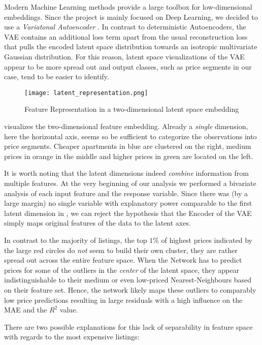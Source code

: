Modern Machine Learning methods provide a large toolbox for low-dimensional embeddings.
Since the project is mainly focused on Deep Learning, we decided to use a \emph{Variatonal Autoencoder} \citep{kingma2014}.
In contrast to deterministic Autoencoders, the VAE contains an additional loss term apart from the usual reconstruction loss that pulls the encoded latent space distribution towards an isotropic multivariate Gaussian distribution.
For this reason, latent space visualizations of the VAE appear to be more spread out and output classes, such as price segments in our case, tend to be easier to identify.

\begin{figure}[t]
  \centering
  \texttt{[image: latent\_representation.png]}
  \caption{Feature Representation in a two-dimensional latent space embedding}
  \label{fig:latent-representation}
\end{figure}

 visualizes the two-dimensional feature embedding.
Already a \emph{single} dimension, here the horizontal axis, seems so be sufficient to categorize the observations into price segments.
Cheaper apartments in blue are clustered on the right, medium prices in orange in the middle and higher prices in green are located on the left.

It is worth noting that the latent dimensions indeed \emph{combine} information from multiple features.
At the very beginning of our analysis we performed a bivariate analysis of each input feature and the response variable.
Since there was (by a large margin) no single variable with explanatory power comparable to the first latent dimension in , we can reject the hypothesis that the Encoder of the VAE simply maps original features of the data to the latent axes.

In contrast to the majority of listings, the top $1$\% of highest prices indicated by the large red circles do \emph{not} seem to build their own cluster, they are rather spread out across the entire feature space.
When the Network has to predict prices for some of the outliers in the \emph{center} of the latent space, they appear indistinguishable to their medium or even low-priced Nearest-Neighbours based on their feature set.
Hence, the network likely maps these outliers to comparably low price predictions resulting in large residuals with a high influence on the MAE and the $R^2$ value.

There are two possible explanations for this lack of separability in feature space with regards to the most expensive listings:

